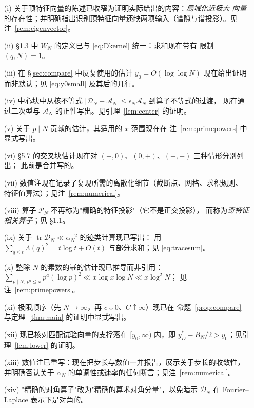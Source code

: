\documentclass[12pt,a4paper]{amsart}
\numberwithin{equation}{section}
\theoremstyle{plain}
\theoremstyle{definition}
\begin{document}
\begin{enumerate}
\item[\rm(i)] 关于顶特征向量的陈述已收窄为证明实际给出的内容：\emph{局域化近极大
向量}的存在性；并明确指出识别顶特征向量还缺两项输入（谱隙与谱投影）。见注~\ref{rem:eigenvector}。
\item[\rm(ii)] \S1.3 中 $W_N$ 的定义已与 \eqref{eq:Dkernel} 统一：求和现在带有
限制 $(q,N)=1$。
\item[\rm(iii)] 在 \S\ref{sec:compare} 中反复使用的估计 $y_0=O(\log\log N)$
现在给出证明而非默认；见 \eqref{eq:y0small} 及其后的几行。
\item[\rm(iv)] 中心块中从核不等式
$|\mathscr D_N-\mathscr A_N|\le\epsilon_N\mathscr A_N$ 到算子不等式的过渡，
现在通过二次型与 $\mathscr A_N$ 的正性写出。见引理~\ref{lem:center} 的证明。
\item[\rm(v)] 关于 $p\mid N$ 贡献的估计，其适用的 $x$ 范围现在在
注~\ref{rem:primepowers} 中显式写出。
\item[\rm(vi)] \S5.7 的交叉块估计现在对 $(-,0)$、$(0,+)$、$(-,+)$ 三种情形分别列出；
此前是合并写的。
\item[\rm(vii)] 数值注现在记录了复现所需的离散化细节（截断点、网格、求积规则、
特征值算法）；见注~\ref{rem:numerical}。
\item[\rm(viii)] 算子 $\mathcal P_N$ 不再称为"精确的特征投影"（它不是正交投影），
而称为\emph{奇特征相关算子}；见 \S1.1。
\item[\rm(ix)] 关于 $\operatorname{tr}\mathcal D_N\ll\alpha_N^{-2}$ 的迹类计算现已写出：
用 $\sum_{q\le t}\Lambda(q)^2=t\log t+O(t)$ 与部分求和；见 \eqref{eq:tracesum}。
\item[\rm(x)] 整除 $N$ 的素数的幂的估计现已推导而非引用：
$\sum_{p\mid N,\,p^a\le x}p^a(\log p)^2\ll x\log x\log N\ll x\log^2N$；
见注~\ref{rem:primepowers}。
\item[\rm(xi)] 极限顺序（先 $N\to\infty$，再 $c\downarrow0$、$C\uparrow\infty$）现已在
命题~\ref{prop:compare} 与定理~\ref{thm:main} 的证明中显式写出。
\item[\rm(xii)] 现已核对匹配试验向量的支撑落在 $[y_0,\infty)$ 内，即
$y_D^*-B_N/2>y_0$；见引理~\ref{lem:lower} 的证明。
\item[\rm(xiii)] 数值注已重写：现在把步长与数值一并报告，展示关于步长的收敛性，
并明确否认关于 $\alpha_N$ 的单调性或速率的任何断言；见注~\ref{rem:numerical}。
\item[\rm(xiv)] "精确的对角算子"改为"精确的算术对角分量"，以免暗示 $\mathcal D_N$
在 Fourier--Laplace 表示下是对角的。
\end{enumerate}
\end{document}
